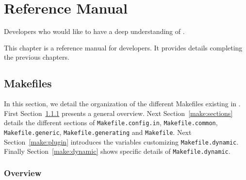 
\chapter{Reference Manual}\label{chap:refman}

\begin{target}
Developers who would like to have a deep understanding of \framac.
\end{target}

This chapter is a reference manual for \framac developers. It provides details
completing the previous chapters.


\section{Makefiles}\label{refman:make}

In this section, we detail the organization of the different Makefiles existing
in \framac. First Section~\ref{make:overview} presents a general overview. Next
Section~\ref{make:sections} details the different sections of
\texttt{Makefile.config.in}, \texttt{Makefile.common},
\texttt{Makefile.generic}, \texttt{Makefile.generating} and
\texttt{Makefile}. Next Section~\ref{make:plugin} introduces the variables
customizing \texttt{Makefile.dynamic}. Finally
Section~\ref{make:dynamic} shows specific details of \texttt{Makefile.dynamic}.

\subsection{Overview}\label{make:overview}

